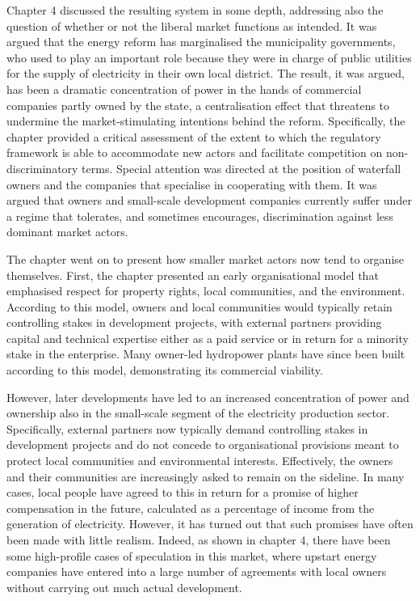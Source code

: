 Chapter 4 discussed the resulting system in some depth, addressing also the question of whether or not the liberal market functions as intended. It was argued that the energy reform has marginalised the municipality governments, who used to play an important role because they were in charge of public utilities for the supply of electricity in their own local district. The result, it was argued, has been a dramatic concentration of power in the hands of commercial companies partly owned by the state, a centralisation effect that threatens to undermine the market-stimulating intentions behind the reform. Specifically, the chapter provided a critical assessment of the extent to which the regulatory framework is able to accommodate new actors and facilitate competition on non-discriminatory terms. Special attention was directed at the position of waterfall owners and the companies that specialise in cooperating with them. It was argued that owners and small-scale development companies currently suffer under a regime that tolerates, and sometimes encourages, discrimination against less dominant market actors.

The chapter went on to present how smaller market actors now tend to organise themselves. First, the chapter presented an early organisational model that emphasised respect for property rights, local communities, and the environment. According to this model, owners and local communities would typically retain controlling stakes in development projects, with external partners providing capital and technical expertise either as a paid service or in return for a minority stake in the enterprise. Many owner-led hydropower plants have since been built according to this model, demonstrating its commercial viability. 

However, later developments have led to an increased concentration of power and ownership also in the small-scale segment of the electricity production sector. Specifically, external partners now typically demand controlling stakes in development projects and do not concede to organisational provisions meant to protect local communities and environmental interests. Effectively, the owners and their communities are increasingly asked to remain on the sideline. In many cases, local people have agreed to this in return for a promise of higher compensation in the future, calculated as a percentage of income from the generation of electricity. However, it has turned out that such promises have often been made with little realism. Indeed, as shown in chapter 4, there have been some high-profile cases of speculation in this market, where upstart energy companies have entered into a large number of agreements with local owners without carrying out much actual development. %

